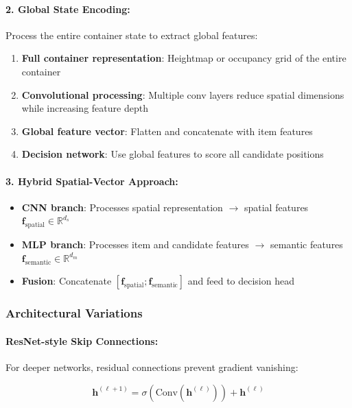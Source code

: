 \paragraph{2. Global State Encoding:}

Process the entire container state to extract global features:

\begin{enumerate}
\item \textbf{Full container representation}: Heightmap or occupancy grid of the entire container
\item \textbf{Convolutional processing}: Multiple conv layers reduce spatial dimensions while increasing feature depth
\item \textbf{Global feature vector}: Flatten and concatenate with item features
\item \textbf{Decision network}: Use global features to score all candidate positions
\end{enumerate}

\paragraph{3. Hybrid Spatial-Vector Approach:}

\begin{itemize}
\item \textbf{CNN branch}: Processes spatial representation $\to$ spatial features $\mathbf{f}_{\text{spatial}} \in \mathbb{R}^{d_s}$
\item \textbf{MLP branch}: Processes item and candidate features $\to$ semantic features $\mathbf{f}_{\text{semantic}} \in \mathbb{R}^{d_m}$
\item \textbf{Fusion}: Concatenate $[\mathbf{f}_{\text{spatial}}; \mathbf{f}_{\text{semantic}}]$ and feed to decision head
\end{itemize}

\subsubsection{Architectural Variations}

\paragraph{ResNet-style Skip Connections:}

For deeper networks, residual connections prevent gradient vanishing:

\begin{equation}
\mathbf{h}^{(\ell+1)} = \sigma(\text{Conv}(\mathbf{h}^{(\ell)})) + \mathbf{h}^{(\ell)}
\end{equation}

